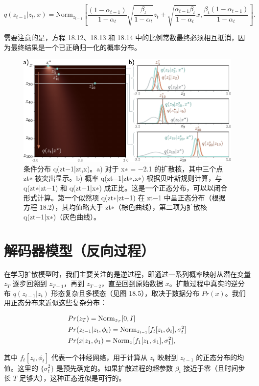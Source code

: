 \documentclass[lang=cn,newtx,10pt,scheme=chinese]{elegantbook}
\begin{document}
\begin{equation}
q(z_{t-1}|z_t, x) = \text{Norm}_{z_{t-1}} \left[
\frac{(1 - \alpha_{t-1})}{1 - \alpha_t} \sqrt{\frac{\beta_t}{1 - \alpha_t}} z_t + \sqrt{\frac{\alpha_{t-1}\beta_t}{1 - \alpha_t}} x, 
\frac{\beta_t (1 - \alpha_{t-1})}{1 - \alpha_t} 
\right]. 
\end{equation}

需要注意的是，方程 18.12、18.13 和 18.14 中的比例常数最终必须相互抵消，因为最终结果是一个已正确归一化的概率分布。

\begin{figure}[ht!]
\centering
\includegraphics[width=0.7\linewidth]{PDFFigures/UDLChap18PDF/DiffusionReverseConditional.pdf}
\caption{条件分布 q(zt−1|zt,x)。a) 对于 x∗ = −2.1 的扩散核，其中三个点 zt∗ 被突出显示。b) 概率 q(zt−1|zt∗,x∗) 根据贝叶斯规则计算，与 q(zt∗|zt−1) 和 q(zt−1|x∗) 成正比。这是一个正态分布，可以以闭合形式计算。第一个似然项 q(zt∗|zt−1) 在 zt−1 中呈正态分布（根据方程 18.2），其均值略大于 zt∗（棕色曲线），第二项为扩散核 q(zt−1|x∗)（灰色曲线）。}
\end{figure}


\section{解码器模型（反向过程）}
在学习扩散模型时，我们主要关注的是逆过程，即通过一系列概率映射从潜在变量 \(z_T\) 逐步回溯到 \(z_{T-1}\)，再到 \(z_{T-2}\)，直至回到原始数据 \(x\)。扩散过程中真实的逆分布 \(q(z_{t-1}|z_t)\) 形态复杂且多模态（见图 18.5），取决于数据分布 \(Pr(x)\)。我们用正态分布来近似这些复杂分布：


\begin{align}
&Pr(z_T) = \text{Norm}_{z_T}[0, I] \notag \\
&Pr(z_{t-1}|z_t, \phi_t) = \text{Norm}_{z_{t-1}}[f_t[z_t, \phi_t], \sigma_t^2] \notag \\
&Pr(x|z_1, \phi_1) = \text{Norm}_{x}[f_1[z_1, \phi_1], \sigma_1^2], 
\end{align} 


其中 \(f_t[z_t, \phi_t]\) 代表一个神经网络，用于计算从 \(z_t\) 映射到 \(z_{t-1}\) 的正态分布的均值。这里的 \(\{\sigma_t^2\}\) 是预先确定的。如果扩散过程的超参数 \(\beta_t\) 接近于零（且时间步长 \(T\) 足够大），这种正态近似是可行的。
\end{document}
